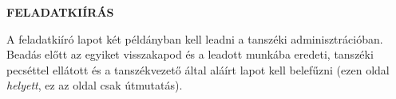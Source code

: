 \clearpage

\begin{center}
\large
\textbf{FELADATKIÍRÁS}\\
\end{center}
A feladatkiíró lapot két példányban kell leadni a tanszéki adminisztrációban. Beadás előtt az egyiket visszakapod és a leadott munkába eredeti, tanszéki pecséttel ellátott és a tanszékvezető által aláírt lapot kell belefűzni (ezen oldal \emph{helyett}, ez az oldal csak útmutatás).

%

